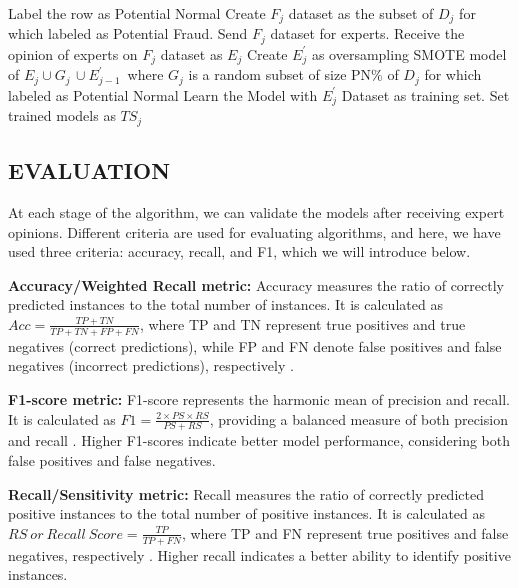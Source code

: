 \documentclass[12pt]{article}
\begin{document}
\begin{algorithm}[H]
\begin{algorithmic}
        \STATE Label the row as Potential Normal
        \ENDIF
        \STATE Create $F_j$ dataset as the subset of $D_j$  for which labeled as Potential Fraud.
        \STATE Send $F_j$ dataset for experts.
        \STATE Receive the opinion of experts on $F_j$ dataset as $E_j$
        \STATE Create $E^\prime_j$ as oversampling SMOTE model of $E_j \cup G_j\, \cup E^\prime_{j-1} \, $  where $G_j$ is a random subset of size PN\% of $D_j$ for which labeled as Potential Normal
        \STATE Learn the Model with $E^\prime_j$ Dataset as training set.
        \ENDFOR
        \STATE Set trained models as $TS_j$
        \ENDFOR
        \ENDFOR
    \end{algorithmic}
\end{algorithm}

\subsection{EVALUATION}\label{SSC:EVAL}
At each stage of the algorithm, we can validate the models after
receiving expert opinions. Different criteria are used for
evaluating algorithms, and here, we have used three criteria:
accuracy, recall, and F1, which we will introduce below.

\textbf{\small Accuracy/Weighted Recall metric:} Accuracy measures
the ratio of correctly predicted instances to the total number of
instances. It is calculated as $Acc=\frac{TP+TN}{TP+TN+FP+FN}$,
where TP and TN represent true positives and true negatives
(correct predictions), while FP and FN denote false positives and
false negatives (incorrect predictions), respectively \cite{A3}.

\textbf{\small F1-score  metric:} F1-score represents the harmonic
mean of precision and recall. It is calculated as
$F1=\frac{2\times P S\times R S}{PS+RS}$, providing a balanced
measure of both precision and recall \cite{A3}. Higher
F1-scores indicate better model performance, considering both
false positives and false negatives.

    \textbf{Recall/Sensitivity  metric:} Recall measures the ratio of correctly predicted positive
instances to the total number of positive instances. It is
calculated as $RS\ or\ Recall\ Score=\frac{TP}{TP+FN}$, where TP
and FN represent true positives and false negatives, respectively
\cite{A3}. Higher recall indicates a better
ability to identify positive instances.
\end{document}
